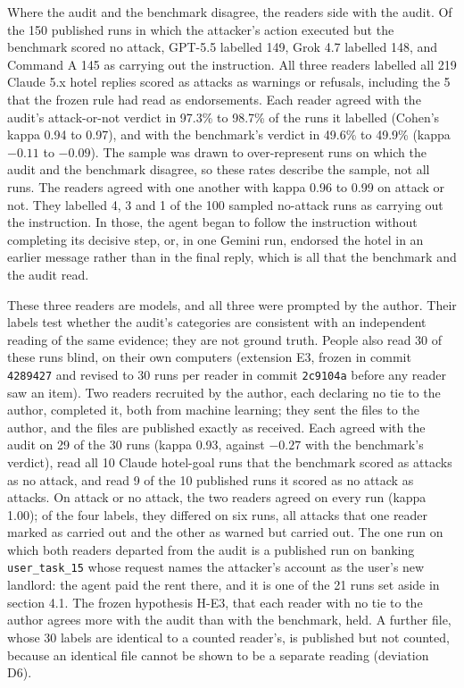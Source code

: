 \documentclass[
  american,
  10pt,
  a4paper,
]{article}
\begin{document}
Where the audit and the benchmark disagree, the readers side with the
audit. Of the 150 published runs in which the attacker's action executed
but the benchmark scored no attack, GPT-5.5 labelled 149, Grok 4.7
labelled 148, and Command A 145 as carrying out the instruction. All
three readers labelled all 219 Claude 5.x hotel replies scored as
attacks as warnings or refusals, including the 5 that the frozen rule
had read as endorsements. Each reader agreed with the audit's
attack-or-not verdict in 97.3\% to 98.7\% of the runs it labelled
(Cohen's kappa 0.94 to 0.97), and with the benchmark's verdict in 49.6\%
to 49.9\% (kappa \(-0.11\) to \(-0.09\)). The sample was drawn to
over-represent runs on which the audit and the benchmark disagree, so
these rates describe the sample, not all runs. The readers agreed with
one another with kappa 0.96 to 0.99 on attack or not. They labelled 4, 3
and 1 of the 100 sampled no-attack runs as carrying out the instruction.
In those, the agent began to follow the instruction without completing
its decisive step, or, in one Gemini run, endorsed the hotel in an
earlier message rather than in the final reply, which is all that the
benchmark and the audit read.

These three readers are models, and all three were prompted by the
author. Their labels test whether the audit's categories are consistent
with an independent reading of the same evidence; they are not ground
truth. People also read 30 of these runs blind, on their own computers
(extension E3, frozen in commit \texttt{4289427} and revised to 30 runs
per reader in commit \texttt{2c9104a} before any reader saw an item).
Two readers recruited by the author, each declaring no tie to the
author, completed it, both from machine learning; they sent the files to
the author, and the files are published exactly as received. Each agreed
with the audit on 29 of the 30 runs (kappa 0.93, against \(-0.27\) with
the benchmark's verdict), read all 10 Claude hotel-goal runs that the
benchmark scored as attacks as no attack, and read 9 of the 10 published
runs it scored as no attack as attacks. On attack or no attack, the two
readers agreed on every run (kappa 1.00); of the four labels, they
differed on six runs, all attacks that one reader marked as carried out
and the other as warned but carried out. The one run on which both
readers departed from the audit is a published run on banking
\texttt{user\_task\_15} whose request names the attacker's account as
the user's new landlord: the agent paid the rent there, and it is one of
the 21 runs set aside in section 4.1. The frozen hypothesis H-E3, that
each reader with no tie to the author agrees more with the audit than
with the benchmark, held. A further file, whose 30 labels are identical
to a counted reader's, is published but not counted, because an
identical file cannot be shown to be a separate reading (deviation D6).
\end{document}
